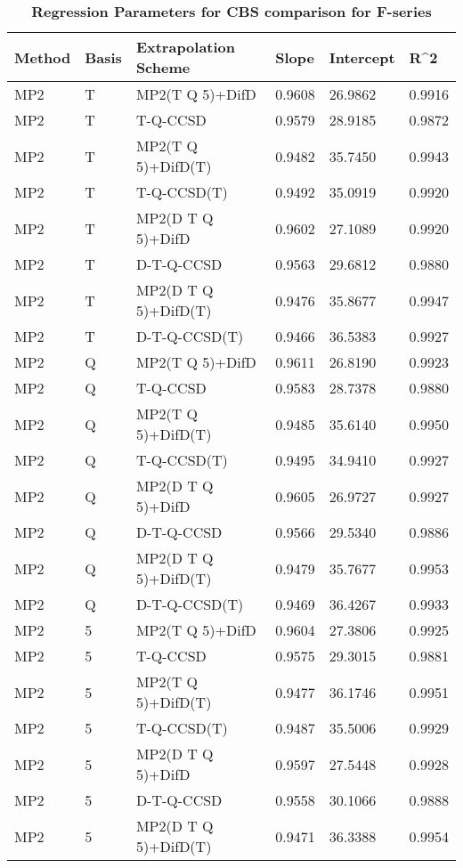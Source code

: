 \begin{table}
  \caption{\textbf{Regression Parameters for CBS comparison for F-series}}
  \label{tbl:regression-two-f}
  \begin{tabular}{l l l l l l }
    \hline
    Method & Basis & Extrapolation Scheme & Slope & Intercept & R^2 \\ 
    \hline
    MP2 & T & MP2(T Q 5)+DifD & 0.9608 & 26.9862 & 0.9916 \\ 
    MP2 & T & T-Q-CCSD & 0.9579 & 28.9185 & 0.9872 \\ 
    MP2 & T & MP2(T Q 5)+DifD(T) & 0.9482 & 35.7450 & 0.9943 \\ 
    MP2 & T & T-Q-CCSD(T) & 0.9492 & 35.0919 & 0.9920 \\ 
    MP2 & T & MP2(D T Q 5)+DifD & 0.9602 & 27.1089 & 0.9920 \\ 
    MP2 & T & D-T-Q-CCSD & 0.9563 & 29.6812 & 0.9880 \\ 
    MP2 & T & MP2(D T Q 5)+DifD(T) & 0.9476 & 35.8677 & 0.9947 \\ 
    MP2 & T & D-T-Q-CCSD(T) & 0.9466 & 36.5383 & 0.9927 \\ 
    MP2 & Q & MP2(T Q 5)+DifD & 0.9611 & 26.8190 & 0.9923 \\ 
    MP2 & Q & T-Q-CCSD & 0.9583 & 28.7378 & 0.9880 \\ 
    MP2 & Q & MP2(T Q 5)+DifD(T) & 0.9485 & 35.6140 & 0.9950 \\ 
    MP2 & Q & T-Q-CCSD(T) & 0.9495 & 34.9410 & 0.9927 \\ 
    MP2 & Q & MP2(D T Q 5)+DifD & 0.9605 & 26.9727 & 0.9927 \\ 
    MP2 & Q & D-T-Q-CCSD & 0.9566 & 29.5340 & 0.9886 \\ 
    MP2 & Q & MP2(D T Q 5)+DifD(T) & 0.9479 & 35.7677 & 0.9953 \\ 
    MP2 & Q & D-T-Q-CCSD(T) & 0.9469 & 36.4267 & 0.9933 \\ 
    MP2 & 5 & MP2(T Q 5)+DifD & 0.9604 & 27.3806 & 0.9925 \\ 
    MP2 & 5 & T-Q-CCSD & 0.9575 & 29.3015 & 0.9881 \\ 
    MP2 & 5 & MP2(T Q 5)+DifD(T) & 0.9477 & 36.1746 & 0.9951 \\ 
    MP2 & 5 & T-Q-CCSD(T) & 0.9487 & 35.5006 & 0.9929 \\ 
    MP2 & 5 & MP2(D T Q 5)+DifD & 0.9597 & 27.5448 & 0.9928 \\ 
    MP2 & 5 & D-T-Q-CCSD & 0.9558 & 30.1066 & 0.9888 \\ 
    MP2 & 5 & MP2(D T Q 5)+DifD(T) & 0.9471 & 36.3388 & 0.9954 \\ 

\end{tabular}
\end{table}
